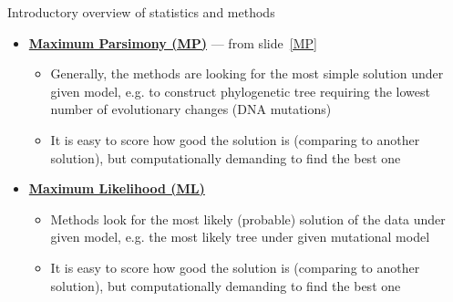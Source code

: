 \documentclass[compress, ucs, xelatex, 11pt, xcolor=svgnames, aspectratio=169,
	hyperref={
		bookmarks=true,
		unicode=true,
		colorlinks=true,
		pdftitle={Molecular data in R},
		plainpages=false,
		pdfauthor={Vojtech Zeisek},
		pdfsubject={Course about phylogeny and evolution in R},
		pdfcreator={XeLaTeX},
		pdfkeywords={R, evolution, phylogeny, molecular data},
		linkcolor=Crimson, %
		anchorcolor=Magenta, %
		citecolor=Magenta, %
		filecolor=Magenta, %
		menucolor=Magenta, %
		urlcolor=DodgerBlue, %
		pdftex},
	url={hyphens, lowtilde} %
	]{beamer}
\begin{document}
\begin{frame}[allowframebreaks]{Introductory overview of statistics and methods}
\begin{itemize}
		\begin{itemize}
			\item Two variables are easily displayable in 2D xy-scatter plot (we can calculate correlation, whatever)
			\item In molecular data, each locus is more or less independent variable --- 1000~bp alignment has 1000 variables: How to display plot with 1000 axes to be able to really see something?
			\item Methods like Principal Component Analysis (\textbf{PCA}), Non-Metric Multidimensional Scaling (\textbf{NMDS}) or \textbf{PCoA} look for correlations between pairs of variables to reduce them into new variables --- after many steps new uncorrelated variables retaining maximum of original variability are constructed
			\item New variables are sorted according amount of variability they show (the decrease is very steep --- first 1--4~axes are usually enough) --- it is possible to display xy-scatter plot showing most of variability of the data
			\item Good for data display and creation of hypotheses --- not to verify them (there is no statistical test)
			\item Data are commonly scaled --- all variables are in same scale
		\end{itemize}
		\item \textbf{\href{https://en.wikipedia.org/wiki/Maximum_parsimony_(phylogenetics)}{Maximum Parsimony (MP)}} --- from slide~\ref{MP}
		\begin{itemize}
			\item Generally, the methods are looking for the most simple solution under given model, e.g. to construct phylogenetic tree requiring the lowest number of evolutionary changes (DNA mutations)
			\item It is easy to score how good the solution is (comparing to another solution), but computationally demanding to find the best one
		\end{itemize}
		\item \textbf{\href{https://en.wikipedia.org/wiki/Maximum_likelihood_estimation}{Maximum Likelihood (ML)}}
		\begin{itemize}
			\item Methods look for the most likely (probable) solution of the data under given model, e.g. the most likely tree under given mutational model
			\item It is easy to score how good the solution is (comparing to another solution), but computationally demanding to find the best one

\end{itemize}
\end{itemize}
\end{frame}
\end{document}
